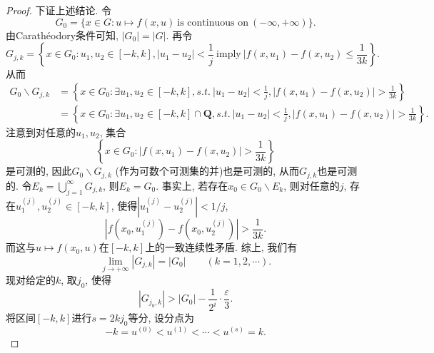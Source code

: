 \begin{lemma}
\begin{proof}
        下证上述结论. 令 
        \begin{equation*}
            G_0 = \{x \in G\colon u \mapsto f(x, u)\ \text{is continuous on}\ (-\infty, +\infty)\}.
        \end{equation*}
        由Carath\'eodory条件可知, $|G_0| = |G|$. 再令 
        \begin{equation*}
            G_{j, k} = \left\{x \in G_0\colon u_1, u_2 \in [-k, k], |u_1 - u_2| < \frac{1}{j}\ \text{imply}\ |f(x, u_1) - f(x, u_2) \leq \frac{1}{3k}\right\}.
        \end{equation*}
        从而 
        \begin{align*}
            G_0 \smallsetminus G_{j, k} &= \left\{x \in G_0\colon \exists u_1, u_2 \in [-k, k], s.t. \ |u_1 - u_2| < \frac{1}{j}, |f(x, u_1) - f(x, u_2)| > \frac{1}{3k}\right\} \\
            &= \left\{x \in G_0\colon \exists u_1, u_2 \in [-k, k] \cap \mathbf{Q}, s.t. \ |u_1 - u_2| < \frac{1}{j}, |f(x, u_1) - f(x, u_2)| > \frac{1}{3k}\right\}.
        \end{align*}
        注意到对任意的$u_1, u_2$, 集合 
        \begin{equation*}
            \left\{x \in G_0\colon |f(x, u_1) - f(x, u_2)| > \frac{1}{3k}\right\}
        \end{equation*}
        是可测的, 因此$G_0 \smallsetminus G_{j, k}$ (作为可数个可测集的并)也是可测的, 从而$G_{j, k}$也是可测的. 令$E_k = \bigcup_{j = 1}^{\infty}G_{j, k}$, 则$E_k = G_0$. 事实上, 若存在$x_0 \in G_0 \smallsetminus E_k$, 则对任意的$j$, 存在$u_1^{(j)}, u_2^{(j)} \in [-k, k]$, 使得$|u_1^{(j)} - u_2^{(j)}| < 1/j$,  
        \begin{equation*}
            |f(x_0, u_1^{(j)}) - f(x_0, u_2^{(j)})| > \frac{1}{3k}.
        \end{equation*}
        而这与$u \mapsto f(x_0, u)$在$[-k, k]$上的一致连续性矛盾. 综上, 我们有 
        \begin{equation*}
            \lim\limits_{j \rightarrow +\infty}|G_{j, k}| = |G_0| \qquad (k = 1, 2, \cdots).
        \end{equation*}
        现对给定的$k$, 取$j_0$, 使得 
        \begin{equation*}
            |G_{j_0, k}| > |G_0| - \frac{1}{2^i} \cdot \frac{\varepsilon}{3}.
        \end{equation*}
        将区间$[-k, k]$进行$s = 2kj_0$等分, 设分点为 
        \begin{equation*}
            -k = u^{(0)} < u^{(1)} < \cdots < u^{(s)} = k.

\end{equation*}
\end{proof}
\end{lemma}
